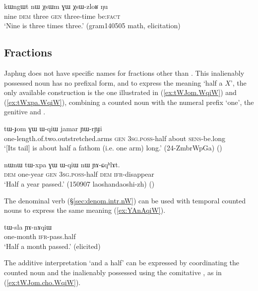 \begin{exe}
\ex \label{ex:XsW.zloR}
\gll  kɯngɯt nɯ χsɯm ɣɯ χsɯ-zloʁ ŋu \\
 nine \textsc{dem} three \textsc{gen} three-time be:\textsc{fact} \\
\glt `Nine is three times three.' (gram140505 math, elicitation)
\end{exe}
 
 
\subsection{Fractions} \label{sec:fractions}
Japhug does not have specific names for fractions other than .  This inalienably possessed noun has no prefixal form, and to express the meaning `half a $X$', the only available construction is the one illustrated in (\ref{ex:tWJom.WqiW}) and (\ref{ex:tWxpa.WqiW}), combining a counted noun with the numeral prefix `one', the genitive  and .


\begin{exe}
\ex \label{ex:tWJom.WqiW}
\gll tɯ-ɟom ɣɯ ɯ-qiɯ jamar ɲɯ-rɲɟi \\
one-length.of.two.outstretched.arms \textsc{gen} \textsc{3sg}.\textsc{poss}-half about \textsc{sens}-be.long \\
\glt `[Its tail] is about half a fathom (i.e. one arm) long.' (24-ZmbrWpGa)
()
\end{exe}

\begin{exe}
\ex \label{ex:tWxpa.WqiW}
\gll nɯnɯ tɯ-xpa ɣɯ ɯ-qiɯ nɯ ɲɤ-ɕqʰlɤt. \\
\textsc{dem} one-year \textsc{gen} \textsc{3sg}.\textsc{poss}-half \textsc{dem} \textsc{ifr}-disappear \\
\glt  `Half a year passed.' (150907 laoshandaoshi-zh)
()
\end{exe}

The denominal verb  (§\ref{sec:denom.intr.nW}) can be used with temporal counted nouns to express the same meaning (\ref{ex:YAnAqiW}).

\begin{exe}
	\ex \label{ex:YAnAqiW}
	\gll tɯ-sla ɲɤ-nɤqiɯ \\
	one-month \textsc{ifr}-pass.half \\
	\glt `Half a month passed.' (elicited)
\end{exe}

The additive interpretation  `and a half' can be expressed by coordinating the counted noun and the inalienably possessed  using the comitative , as in (\ref{ex:tWJom.cho.WqiW}).

